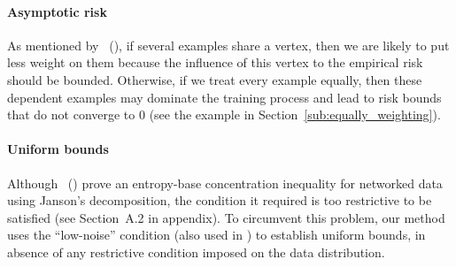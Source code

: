 \documentclass[letterpaper]{article} %
\newcommand{\citet}[1]{\citeauthor{#1}\ (\citeyear{#1})}
\newcommand{\citep}[3]{(#1\ \citeauthor{#3}\ \citeyear{#3},\ #2)}
\begin{document}
\paragraph{Asymptotic risk}
As mentioned by \citet{wang2017learning}, if several examples share a vertex, then we are likely to put less weight on them because the influence of this vertex to the empirical risk should be bounded. Otherwise, if we treat every example equally, then these dependent examples may dominate the training process and lead to risk bounds that do not converge to $0$ (see the example in Section~\ref{sub:equally_weighting}).

\paragraph{Uniform bounds} 
Although \citet{DBLP:conf/icml/RalaivolaA15} prove an entropy-base concentration inequality for networked data using Janson's decomposition, the %
condition it required is too restrictive to be satisfied %
(see Section~A.2 in appendix). 
To circumvent this problem, our method uses 
the ``low-noise'' condition (also used in \cite{papa2016graph}) to establish uniform bounds, 
in absence of any restrictive condition imposed on the data distribution. 


\end{document}
